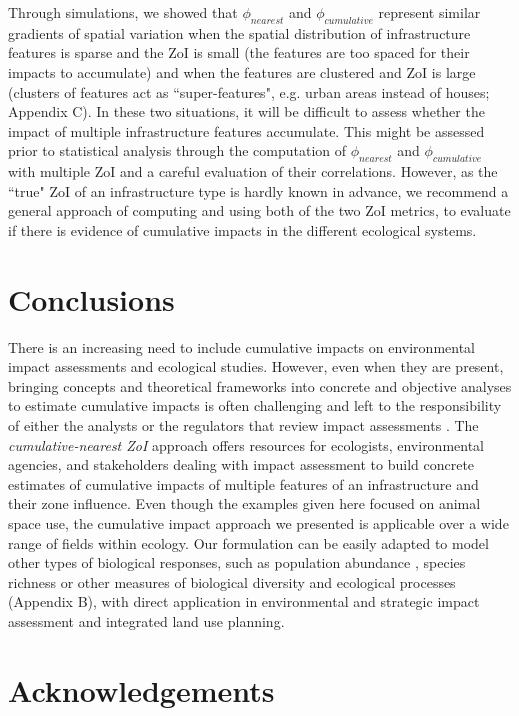 \documentclass[titlepage]{article}
\begin{document}
Through simulations, we showed that $\phi_{nearest}$ and $\phi_{cumulative}$ represent similar gradients of spatial variation when the spatial distribution of infrastructure features is sparse and the ZoI is small (the features are too spaced for their impacts to accumulate) and when the features are clustered and ZoI is large (clusters of features act as ``super-features", e.g. urban areas instead of houses; Appendix C). In these two situations, it will be difficult to assess whether the impact of multiple infrastructure features accumulate. This might be assessed prior to statistical analysis through the computation of $\phi_{nearest}$ and $\phi_{cumulative}$ with multiple ZoI and a careful evaluation of their correlations. However, as the ``true" ZoI of an infrastructure type is hardly known in advance, we recommend a general approach of computing and using both of the two ZoI metrics, to evaluate if there is evidence of cumulative impacts in the different ecological systems.

\section{Conclusions}

There is an increasing need to include cumulative impacts on environmental impact assessments and ecological studies. However, even when they are present, bringing concepts and theoretical frameworks into concrete and objective analyses to estimate cumulative impacts is often challenging and left to the responsibility of either the analysts or the regulators that review impact assessments \citep{johnson_regulating_2011}. The \textit{cumulative-nearest ZoI} approach offers resources for ecologists, environmental agencies, and stakeholders dealing with impact assessment to build concrete estimates of cumulative impacts of multiple features of an infrastructure and their zone influence. 
Even though the examples given here focused on animal space use, the cumulative impact approach we presented is applicable over a wide range
of fields within ecology. Our formulation can be easily adapted to model other types of biological responses, such as population abundance \citep[e.g.][]{benitez-lopez_impacts_2010}, species richness \citep[e.g.][]{ficetola_ecological_2009} or other measures of biological diversity and ecological processes (Appendix B), with direct application in environmental and strategic impact assessment and integrated land use planning.
      
\section*{Acknowledgements}
\end{document}
